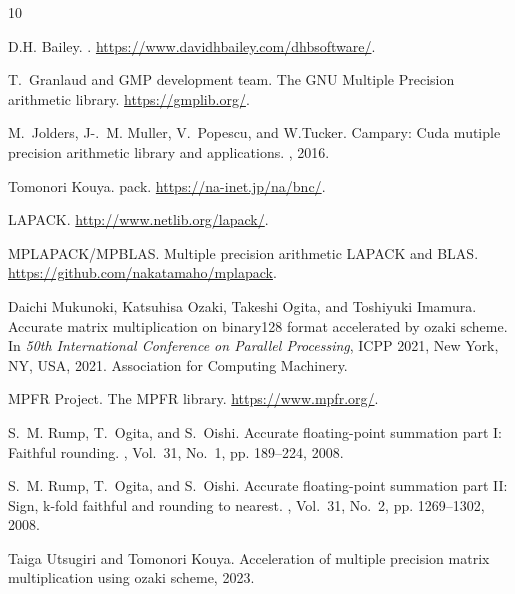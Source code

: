 \documentclass[a4j,report,english]{jsbook}
\begin{document}
%
%
\begin{thebibliography}{10}

    D.H. Bailey.
    .
    \newblock \url{https://www.davidhbailey.com/dhbsoftware/}.
    
    T.~Granlaud and {GMP} development team.
    \newblock The {GNU} {M}ultiple {P}recision arithmetic library.
    \newblock \url{https://gmplib.org/}.
    
    M.~Jolders, J-.~M. {Muller}, V.~Popescu, and W.Tucker.
    \newblock Campary: Cuda mutiple precision arithmetic library and applications.
    , 2016.
    
    Tomonori Kouya.
    pack.
    \newblock \url{https://na-inet.jp/na/bnc/}.
    
    LAPACK.
    \newblock \url{http://www.netlib.org/lapack/}.
    
    MPLAPACK/MPBLAS.
    \newblock Multiple precision arithmetic {LAPACK} and {BLAS}.
    \newblock \url{https://github.com/nakatamaho/mplapack}.
    
    Daichi Mukunoki, Katsuhisa Ozaki, Takeshi Ogita, and Toshiyuki Imamura.
    \newblock Accurate matrix multiplication on binary128 format accelerated by
      ozaki scheme.
    \newblock In {\em 50th International Conference on Parallel Processing}, ICPP
      2021, New York, NY, USA, 2021. Association for Computing Machinery.
    
    {MPFR} Project.
    \newblock The {MPFR} library.
    \newblock \url{https://www.mpfr.org/}.
    
    S.~M. Rump, T.~Ogita, and S.~Oishi.
    \newblock Accurate floating-point summation part {I}: Faithful rounding.
    , Vol.~31, No.~1, pp.
      189--224, 2008.
    
    S.~M. Rump, T.~Ogita, and S.~Oishi.
    \newblock Accurate floating-point summation part {II}: Sign, k-fold faithful
      and rounding to nearest.
    , Vol.~31, No.~2, pp.
      1269--1302, 2008.
    
    Taiga Utsugiri and Tomonori Kouya.
    \newblock Acceleration of multiple precision matrix multiplication using ozaki
      scheme, 2023.
    
\end{thebibliography}
    

\backmatter

\printindex

\end{document}
